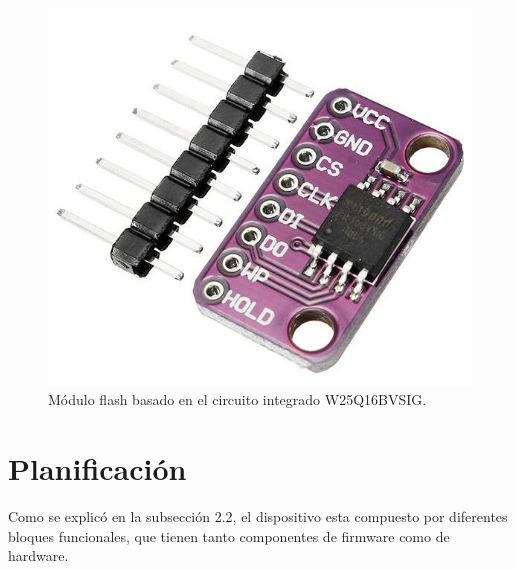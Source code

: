 \begin{itemize}
	\begin{figure}[h]
		\centering
		\includegraphics[scale=0.35]{./Figures/flash.jpg}
		\caption{Módulo flash basado en el circuito integrado W25Q16BVSIG.}
		\label{fig:cuadradoAzul}
	\end{figure}
	
\end{itemize}


\section{Planificación}

Como se explicó en la subsección 2.2, el dispositivo esta compuesto por diferentes bloques funcionales, que tienen tanto componentes de firmware como de hardware. 

